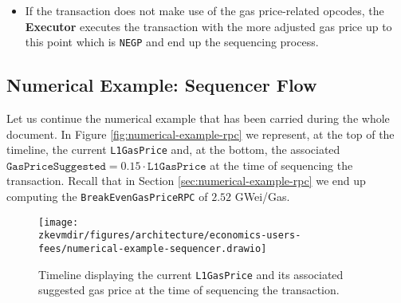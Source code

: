 \begin{enumerate}
\begin{itemize}
\item If the transaction does not make use of the gas price-related opcodes, the \textbf{Executor} executes the transaction with the more adjusted gas price up to this point which is \texttt{NEGP} and end up the sequencing process.

\end{itemize}

\end{enumerate}



\subsection{Numerical Example: Sequencer Flow}


Let us continue the numerical example that has been carried during the whole document. In Figure \ref{fig:numerical-example-rpc} we represent, at the top of the timeline, the current \texttt{L1GasPrice} and, at the bottom, the associated $\texttt{GasPriceSuggested} = 0.15 \cdot \texttt{L1GasPrice}$ at the time of sequencing the transaction. Recall that in Section \ref{sec:numerical-example-rpc} we end up computing the \texttt{BreakEvenGasPriceRPC} of $2.52$ GWei/Gas.


\begin{figure}[H]
\centering
\texttt{[image: \\zkevmdir/figures/architecture/economics-users-fees/numerical-example-sequencer.drawio]}
\caption{Timeline displaying the current \texttt{L1GasPrice} and its associated suggested gas price at the time of sequencing the transaction. }
\label{fig:numerical-example-sequencer}
\end{figure}


